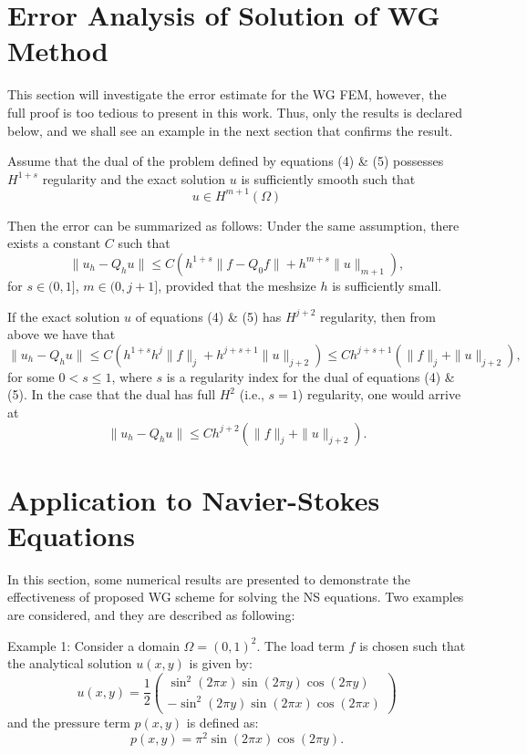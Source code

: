 \documentclass[12pt]{article} %
\begin{document}
\section{Error Analysis of Solution of WG Method}
This section will investigate the error estimate for the WG FEM, however, the full proof is too tedious to present in this work. Thus, only the results is declared below, and we shall see an example in the next section that confirms the result.

Assume that the dual of the problem defined by equations (4) \& (5) possesses \( H^{1+s} \) regularity and the exact solution \( u \) is sufficiently smooth such that 
\[ u \in H^{m+1}(\Omega) \] 

Then the error can be summarized as follows:
Under the same assumption, there exists a constant \( C \) such that
\begin{equation}
    \|u_h - Q_h u\| \leq C \left( h^{1+s} \|f - Q_0 f\| + h^{m+s} \|u\|_{m+1} \right), 
\end{equation}
for \( s \in (0, 1] \), \( m \in (0, j + 1] \), provided that the meshsize \( h \) is sufficiently small.

If the exact solution \( u \) of equations (4) \& (5) has \( H^{j+2} \) regularity, then from above we have that
\begin{equation}
    \|u_h - Q_h u\| \leq C \left( h^{1+s}h^j \|f\|_j + h^{j+s+1} \|u\|_{j+2} \right)
    \leq C h^{j+s+1} \left( \|f\|_j + \|u\|_{j+2} \right),
\end{equation}
for some \( 0 < s \leq 1 \), where \( s \) is a regularity index for the dual of equations (4) \& (5). In the case that the dual has full \( H^2 \) (i.e., \( s = 1 \)) regularity, one would arrive at
\begin{equation}
    \|u_h - Q_h u\| \leq C h^{j+2} \left( \|f\|_j + \|u\|_{j+2} \right).
\end{equation}

\section{Application to Navier-Stokes Equations}
In this section, some numerical results are presented to demonstrate the effectiveness of proposed WG scheme for
solving the NS equations. Two examples\cite{Hu2019} are considered, and they are described as following:

Example 1: Consider a domain \( \Omega = (0, 1)^2 \). The load term \( f \) is chosen such that the analytical solution \( u(x, y) \) is given by:
\begin{equation}
    u(x, y) = \frac{1}{2}
    \begin{pmatrix}
        \sin^2(2\pi x) \sin(2\pi y) \cos(2\pi y) \\
        -\sin^2(2\pi y) \sin(2\pi x) \cos(2\pi x)
    \end{pmatrix}
\end{equation}
and the pressure term \( p(x, y) \) is defined as:
\begin{equation}
    p(x, y) = \pi^2 \sin(2\pi x) \cos(2\pi y).
\end{equation}
\end{document}
